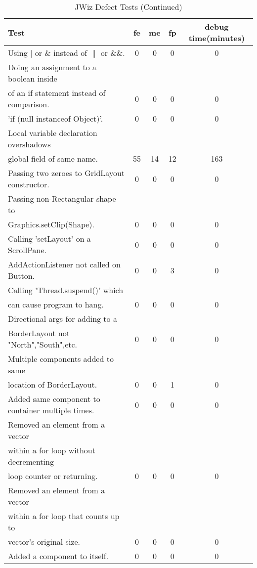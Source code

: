 \setcounter{table}{0}
\begin{table}[htpb]
  \caption{JWiz Defect Tests (Continued)}
  \begin{center}
  \begin{tabular}{|l|c|c|c|c|}
    \hline Test & fe & me & fp & debug time(minutes) \\ \hline \hline
    Using $|$ or \& instead of $\parallel$ or \&\&.
    & 0 & 0 & 0 & 0 \\ \hline
    Doing an assignment to a boolean inside & & & & \\
    of an if statement instead of comparison. 
    & 0 & 0 & 0 & 0 \\ \hline
    'if (null instanceof Object)'.
    & 0 & 0 & 0 & 0 \\ \hline
    Local variable declaration overshadows & & & & \\
    global field of same name.
    & 55 & 14 & 12 & 163 \\ \hline
    Passing two zeroes to GridLayout constructor.
    & 0 & 0 & 0 & 0 \\ \hline
    Passing non-Rectangular shape to  & & & &\\
    Graphics.setClip(Shape).
    & 0 & 0 & 0 & 0 \\ \hline
    Calling 'setLayout' on a ScrollPane.
    & 0 & 0 & 0 & 0 \\ \hline
    AddActionListener not called on Button.
    & 0 & 0 & 3 & 0 \\ \hline
    Calling 'Thread.suspend()' which & & & & \\
    can cause program to hang.
    & 0 & 0 & 0 & 0 \\ \hline
    Directional args for adding to a & & & & \\
    BorderLayout not "North","South",etc.
    & 0 & 0 & 0 & 0 \\ \hline
    Multiple components added to same & & & & \\
    location of BorderLayout.
    & 0 & 0 & 1 & 0 \\ \hline
    Added same component to container multiple times.
    & 0 & 0 & 0 & 0 \\ \hline
    Removed an element from a vector & & & & \\
    within a for loop without decrementing & & & & \\
    loop counter or returning.
    & 0 & 0 & 0 & 0 \\ \hline
    Removed an element from a vector & & & & \\
    within a for loop that counts up to  & & & &\\
    vector's original size.
    & 0 & 0 & 0 & 0 \\ \hline
    Added a component to itself.
    & 0 & 0 & 0 & 0 \\ \hline
   \end{tabular}
  \end{center}
 \label{JWiz Defect Tests (Continued)}
\end{table}


